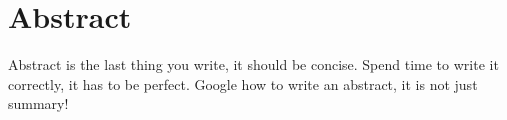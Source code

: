 
\ifx\isEmbedded\undefined


\fi

\section*{Abstract}
\label{sec:abstract}

{
\color{red}
Abstract is the last thing you write, it should be concise. Spend time to write it correctly, it has to be perfect. Google how to write an abstract, it is not just summary!
}



\ifx\isEmbedded\undefined


\pagebreak

\fi